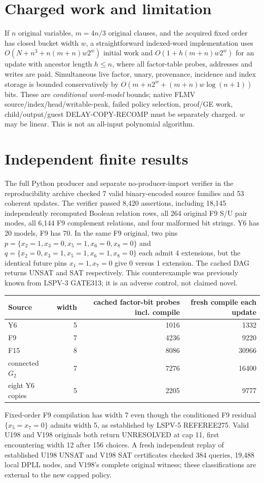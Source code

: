 \documentclass[11pt]{article}
\begin{document}
\section{Charged work and limitation}
If $n$ original variables, $m=4n/3$ original clauses, and the acquired fixed order has closed bucket width $w$, a straightforward indexed-word implementation uses $O(N+n^3+n(m+n)w2^w)$ initial work and $O(1+h(m+n)w2^w)$ for an update with ancestor length $h\le n$, where all factor-table probes, addresses and writes are paid. Simultaneous live factor, unary, provenance, incidence and index storage is bounded conservatively by $O(m+n2^w+(m+n)w\log(n+1))$ bits. These are \emph{conditional word-model} bounds; native FLMV source/index/head/writable-peak, failed policy selection, proof/GE work, child/output/guest DELAY-COPY-RECOMP must be separately charged. $w$ may be linear. This is not an all-input polynomial algorithm.
\section{Independent finite results}
The full Python producer and separate no-producer-import verifier in the reproducibility archive checked 7 valid binary-encoded source families and 53 coherent updates. The verifier passed 8,420 assertions, including 18,145 independently recomputed Boolean relation rows, all 264 original F9 S/U pair modes, all 6,144 F9 complement relations, and four malformed bit strings. Y6 has 20 models, F9 has 70. In the same F9 original, two pins $p=\{x_2=1,x_3=0,x_5=1,x_6=0,x_8=0\}$ and $q=\{x_2=0,x_3=1,x_5=1,x_6=1,x_8=0\}$ each admit 4 extensions, but the identical future pins $x_1=1,x_7=0$ give 0 versus 1 extension. The cached DAG returns UNSAT and SAT respectively. This counterexample was previously known from LSPV-3 GATE313; it is an adverse control, not claimed novel.
\begin{center}\begin{tabular}{lrrr}\toprule Source & width & cached factor-bit probes incl. compile & fresh compile each update\\\midrule Y6 & 5 & 1016 & 1332\\F9 & 7 & 4236 & 9220\\F15 & 8 & 8086 & 30966\\connected $G_2$ & 7 & 7276 & 16400\\eight Y6 copies & 5 & 2205 & 9777\\\bottomrule\end{tabular}\end{center}
Fixed-order F9 compilation has width 7 even though the conditioned F9 residual $\{x_5=x_7=0\}$ admits width 5, as established by LSPV-5 REFEREE275. Valid U198 and V198 originals both return UNRESOLVED at cap 11, first encountering width 12 after 156 choices. A fresh independent replay of established U198 UNSAT and V198 SAT certificates checked 384 queries, 19,488 local DPLL nodes, and V198's complete original witness; these classifications are external to the new capped policy.
\end{document}
